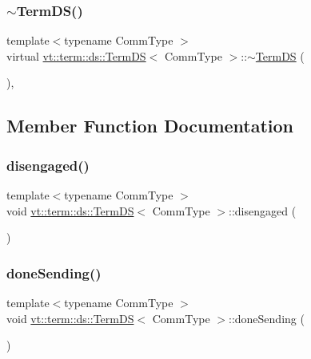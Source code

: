 \subsubsection{\texorpdfstring{$\sim$\+Term\+D\+S()}{~TermDS()}}
{\footnotesize\ttfamily template$<$typename Comm\+Type $>$ \\
virtual \hyperlink{structvt_1_1term_1_1ds_1_1_term_d_s}{vt\+::term\+::ds\+::\+Term\+DS}$<$ Comm\+Type $>$\+::$\sim$\hyperlink{structvt_1_1term_1_1ds_1_1_term_d_s}{Term\+DS} (\begin{DoxyParamCaption}{ }\end{DoxyParamCaption})\hspace{0.3cm}{\ttfamily [virtual]}, {\ttfamily [default]}}



\subsection{Member Function Documentation}
\mbox{\label{structvt_1_1term_1_1ds_1_1_term_d_s_a7f77705496eed386505e5bd266fc9800}} 
\subsubsection{\texorpdfstring{disengaged()}{disengaged()}}
{\footnotesize\ttfamily template$<$typename Comm\+Type $>$ \\
void \hyperlink{structvt_1_1term_1_1ds_1_1_term_d_s}{vt\+::term\+::ds\+::\+Term\+DS}$<$ Comm\+Type $>$\+::disengaged (\begin{DoxyParamCaption}{ }\end{DoxyParamCaption})}

\mbox{\label{structvt_1_1term_1_1ds_1_1_term_d_s_a9723c6b5db4318277329570e0974e1c7}} 
\subsubsection{\texorpdfstring{done\+Sending()}{doneSending()}}
{\footnotesize\ttfamily template$<$typename Comm\+Type $>$ \\
void \hyperlink{structvt_1_1term_1_1ds_1_1_term_d_s}{vt\+::term\+::ds\+::\+Term\+DS}$<$ Comm\+Type $>$\+::done\+Sending (\begin{DoxyParamCaption}{ }\end{DoxyParamCaption})}

